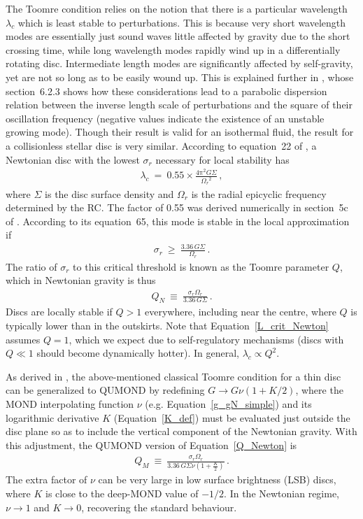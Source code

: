 \documentclass[fleqn,usenatbib,useAMS]{mnras} %
\begin{document}
The Toomre condition relies on the notion that there is a particular wavelength $\lambda_c$ which is least stable to perturbations. This is because very short wavelength modes are essentially just sound waves little affected by gravity due to the short crossing time, while long wavelength modes rapidly wind up in a differentially rotating disc. Intermediate length modes are significantly affected by self-gravity, yet are not so long as to be easily wound up. This is explained further in \citet{Galactic_Dynamics}, whose section~6.2.3 shows how these considerations lead to a parabolic dispersion relation between the inverse length scale of perturbations and the square of their oscillation frequency (negative values indicate the existence of an unstable growing mode). Though their result is valid for an isothermal fluid, the result for a collisionless stellar disc is very similar. According to equation~22 of \citet{Toomre_1964}, a Newtonian disc with the lowest $\sigma_r$ necessary for local stability has
\begin{eqnarray}
	\lambda_c ~=~ 0.55 \times \frac{4 \mathrm{\pi}^2 G \Sigma}{{\Omega_r}^2} \, ,
	\label{L_crit_Newton}
\end{eqnarray}
where $\Sigma$ is the disc surface density and $\Omega_r$ is the radial epicyclic frequency determined by the RC. The factor of 0.55 was derived numerically in section~5c of \citet{Toomre_1964}. According to its equation~65, this mode is stable in the local approximation if
\begin{eqnarray}
	\sigma_r ~\geq~ \frac{3.36 \, G \Sigma}{\Omega_r} \, .
	\label{Min_sigma_r_Newton}
\end{eqnarray}
The ratio of $\sigma_r$ to this critical threshold is known as the Toomre parameter $Q$, which in Newtonian gravity is thus
\begin{eqnarray}
	Q_N ~\equiv~ \frac{\sigma_r \Omega_r}{3.36 \, G \Sigma} \, .
	\label{Q_Newton}
\end{eqnarray}
Discs are locally stable if $Q > 1$ everywhere, including near the centre, where $Q$ is typically lower than in the outskirts. Note that Equation~\ref{L_crit_Newton} assumes $Q = 1$, which we expect due to self-regulatory mechanisms (discs with $Q \ll 1$ should become dynamically hotter). In general, $\lambda_c \propto Q^2$.

As derived in \citet{Banik_2018_Toomre}, the above-mentioned classical Toomre condition for a thin disc can be generalized to QUMOND by redefining $G \to G \nu \left( 1 + K/2 \right)$, where the MOND interpolating function $\nu$ (e.g. Equation~\ref{g_gN_simple}) and its logarithmic derivative $K$ (Equation~\ref{K_def}) must be evaluated just outside the disc plane so as to include the vertical component of the Newtonian gravity. With this adjustment, the QUMOND version of Equation~\ref{Q_Newton} is
\begin{eqnarray}
	Q_M ~\equiv~ \frac{\sigma_r \Omega_r}{3.36 \, G \Sigma \nu \left( 1 + \frac{K}{2} \right)} \, .
	\label{Toomre_MOND}
\end{eqnarray}
The extra factor of $\nu$ can be very large in low surface brightness (LSB) discs, where $K$ is close to the deep-MOND value of $-1/2$. In the Newtonian regime, $\nu \to 1$ and $K \to 0$, recovering the standard behaviour.
\end{document}
